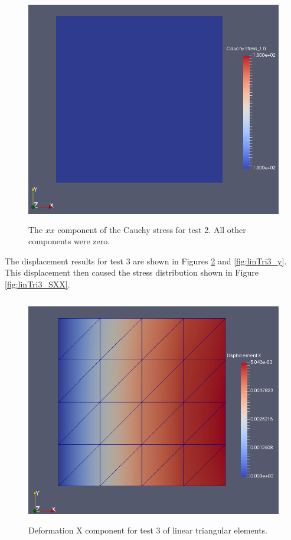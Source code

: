 \documentclass[a4paper, 12pt]{article}
\begin{document}
\begin{figure}[H]
  \centering
  \includegraphics[width=13cm, height=10cm]{tri_4_t2_Sxx}
  \caption{The $xx$ component of the Cauchy stress for test 2.
            All other components were zero.}
  \label{fig:linTri2_SXX}
\end{figure}

The displacement results for test 3 are shown in 
Figures \ref{fig:linTri3_x} and \ref{fig:linTri3_y}.
This displacement then caused the stress distribution 
shown in Figure \ref{fig:linTri3_SXX}.

\begin{figure}[H]
  \centering
  \includegraphics[width=13cm, height=10cm]{tri_4_t3_disp_X}
  \caption{Deformation X component for test 3 of linear 
            triangular elements.}
  \label{fig:linTri3_x}
\end{figure}
\end{document}
